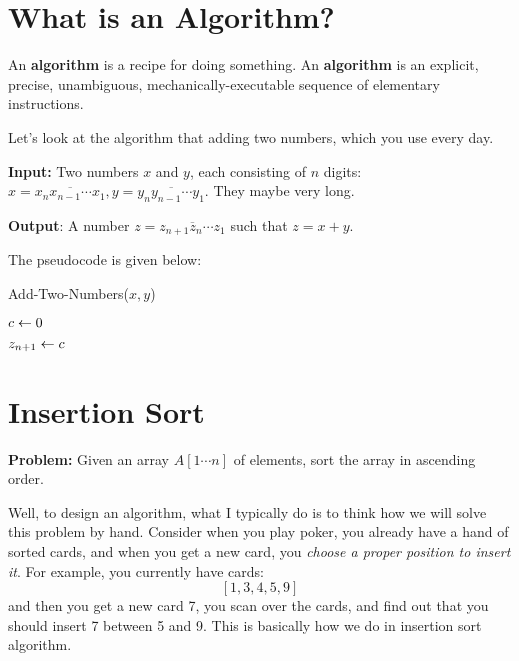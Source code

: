 \begin{spacing}{1.3}
    \section{What is an Algorithm?}
    \begin{definition}
        An {\bf algorithm} is a recipe for doing something.
        An {\bf algorithm} is an explicit, precise, unambiguous, mechanically-executable 
        sequence of elementary instructions.
    \end{definition}

    Let's look at the algorithm that adding two numbers, which you use every day.

    {\bf Input:} Two numbers $x$ and $y$, each consisting of $n$ digits: 
    $x=\overline{x_nx_{n-1}\cdots x_1}, y=\overline{y_ny_{n-1}\cdots y_1}$.
    They maybe very long.

    {\bf Output}: A number $z=\overline{z_{n+1}z_n\cdots z_1}$ such that $z=x+y$.

    The pseudocode is given below:
    \begin{algorithm*}[htbp]
        \caption{Add-Two-Numbers($x, y$)}
        $c\leftarrow 0$ \qquad {}

        $z_{n+1}\leftarrow c$
    \end{algorithm*}


    \vspace{0.3in}
    \section{Insertion Sort}

    {\bf Problem:} Given an array $A[1\cdots n]$ of elements, sort 
    the array in ascending order.

    Well, to design an algorithm, what I typically do is to think how we will 
    solve this problem by hand. Consider when you play poker, you already 
    have a hand of sorted cards, and when you get a new card, you {\it choose 
    a proper position to insert it}. For example, you currently have cards:
    $$[1,3,4,5,9]$$
    and then you get a new card 7, you scan over the cards, and find out 
    that you should insert 7 between 5 and 9. This is basically how we 
    do in insertion sort algorithm.


\end{spacing}
